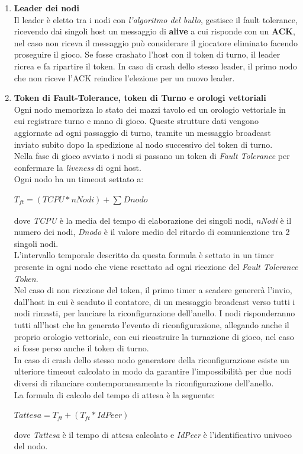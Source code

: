 \documentclass[10pt,a4paper]{article}
\begin{document}
\begin{enumerate}
\item \textbf{Leader dei nodi}\\ Il leader è eletto tra i nodi con \textit{l'algoritmo del bullo}, gestisce il fault tolerance, ricevendo dai singoli host un messaggio di \textbf{alive} a cui risponde con un \textbf{ACK}, nel caso non riceva il messaggio può considerare il giocatore eliminato facendo proseguire il gioco. Se fosse crashato l'host con il token di turno, il leader ricrea e fa ripartire il token. In caso di crash dello stesso leader, il primo nodo che non riceve l'ACK reindice l'elezione per un nuovo leader.

\item \textbf{Token di Fault-Tolerance, token di Turno e orologi vettoriali}\\ Ogni nodo memorizza lo stato dei mazzi tavolo ed un orologio vettoriale in cui registrare turno e mano di gioco. Queste strutture dati vengono aggiornate ad ogni passaggio di turno, tramite un messaggio broadcast inviato subito dopo la spedizione al nodo successivo del token di turno.\\ Nella fase di gioco avviato i nodi si passano un token di \textit{Fault Tolerance} per confermare la \textit{liveness} di ogni host. \\ Ogni nodo ha un timeout settato a: \\\begin{center}$T_{ft} = (TCPU*nNodi)+\sum_{}Dnodo$\end{center} dove \textit{TCPU} è la media del tempo di elaborazione dei singoli nodi, \textit{nNodi} è il numero dei nodi, \textit{Dnodo} è il valore medio del ritardo di comunicazione tra 2 singoli nodi.\\L'intervallo temporale descritto da questa formula è settato in un timer presente in ogni nodo che viene resettato ad ogni ricezione del \textit{Fault Tolerance Token}.\\ Nel caso di non ricezione del token, il primo timer a scadere genererà l'invio, dall'host in cui è scaduto il contatore, di un messaggio broadcast verso tutti i nodi rimasti, per lanciare la riconfigurazione dell'anello. I nodi risponderanno tutti all'host che ha generato l'evento di riconfigurazione, allegando anche il proprio orologio vettoriale, con cui ricostruire la turnazione di gioco, nel caso si fosse perso anche il token di turno. \\ In caso di crash dello stesso nodo generatore della riconfigurazione esiste un ulteriore timeout calcolato in modo da garantire l'impossibilità per due nodi diversi di rilanciare contemporaneamente la riconfigurazione dell'anello.\\ La formula di calcolo del tempo di attesa è la seguente:\begin{center}$Tattesa = T_{ft} +(T_{ft} * IdPeer)$\end{center}dove \textit{Tattesa} è il tempo di attesa calcolato e \textit{IdPeer} è l'identificativo univoco del nodo.\end{enumerate}
\end{document}
